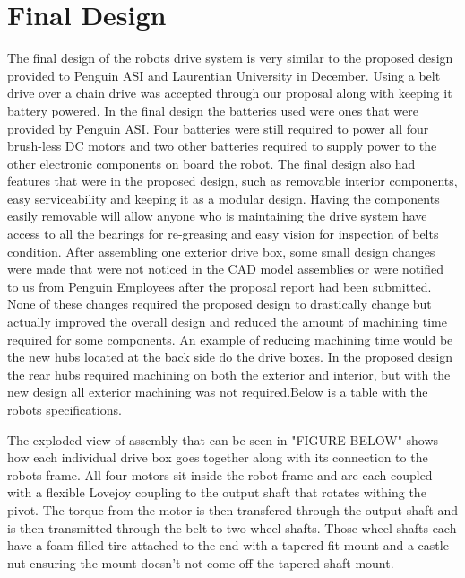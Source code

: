 \section{Final Design}
The final design of the robots drive system is very similar to the proposed design provided to Penguin ASI and Laurentian University in December. Using a belt drive over a chain drive was accepted through our proposal along with keeping it battery powered. In the final design the batteries used were ones that were provided by Penguin ASI. Four batteries were still required to power all four brush-less DC motors and two other batteries required to supply power to the other electronic components on board the robot. The final design also had features that were in the proposed design, such as removable interior components, easy serviceability and keeping it as a modular design. Having the components easily removable will allow anyone who is maintaining the drive system have access to all the bearings for re-greasing and easy vision for inspection of belts condition.  After assembling one exterior drive box, some small design changes were made that were not noticed in the CAD model assemblies or were notified to us from Penguin Employees after the proposal report had been submitted. None of these changes required the proposed design to drastically change but actually improved the overall design and reduced the amount of machining time required for some components. An example of reducing machining time would be the new hubs located at the back side do the drive boxes. In the proposed design the rear hubs required machining on both the exterior and interior, but with the new design all exterior machining was not required.Below is a table with the robots specifications.

The exploded view of assembly that can be seen in "FIGURE BELOW" shows how each individual drive box goes together along with its connection to the robots frame. All four motors sit inside the robot frame and are each coupled with a flexible Lovejoy coupling to the output shaft that rotates withing the pivot. The torque from the motor is then transfered through the output shaft and is then transmitted through the belt to two wheel shafts. Those wheel shafts each have a foam filled tire attached to the end with a tapered fit mount and a castle nut ensuring the mount doesn't not come off the tapered shaft mount.

\begin{comment}
	\texttt{[image: drive\_box\_presentation\_rndr.jpg]}
	\caption{Rendering showing one quarter of robot exterior drive assembly with front case frame and wheels off. }
	\label{fig:Assembly of quarter robot}
\end{comment}


